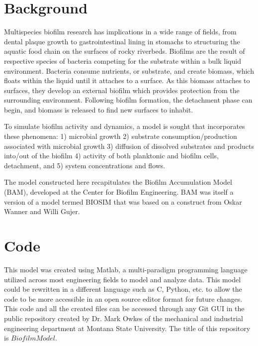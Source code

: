 \documentclass[letterpaper, twoside]{article}
\numberwithin{equation}{section}
\begin{document}
\section{Background}
Multispecies biofilm research has implications in a wide range of fields, from dental plaque growth to gastrointestinal lining in stomachs to structuring the aquatic food chain on the surfaces of rocky riverbeds. Biofilms are the result of respective species of bacteria competing for the substrate within a bulk liquid environment. Bacteria consume nutrients, or substrate, and create biomass, which floats within the liquid until it attaches to a surface. As this biomass attaches to surfaces, they develop an external biofilm which provides protection from the surrounding environment. Following biofilm formation, the detachment phase can begin, and biomass is released to find new surfaces to inhabit.

To simulate biofilm activity and dynamics, a model is sought that incorporates these phenomena: 1) microbial growth 2) substrate consumption/production associated with microbial growth 3) diffusion of dissolved substrates and products into/out of the biofilm 4) activity of both planktonic and biofilm cells, detachment, and 5) system concentrations and flows.

The model constructed here recapitulates the Biofilm Accumulation Model (BAM), developed at the Center for Biofilm Engineering. BAM was itself a version of a model termed BIOSIM that was based on a construct from Oskar Wanner and Willi Gujer.

\section{Code}
This model was created using Matlab, a multi-paradigm programming language utilized across most engineering fields to model and analyze data. This model could be rewritten in a different language such as C, Python, etc. to allow the code to be more accessible in an open source editor format for future changes. This code and all the created files can be accessed through any Git GUI in the public repository created by Dr. Mark Owkes of the mechanical and industrial engineering department at Montana State University. The title of this repository is $BiofilmModel$.
\end{document}
